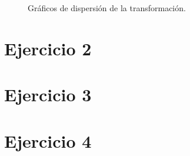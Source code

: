 \documentclass[12pt, a4paper]{article}
\begin{document}
\begin{figure}[htbp]
  \centering
  \hfill
  \caption{Gráficos de dispersión de la transformación.}
  \label{fig:imgs_comp}
\end{figure}

\section{Ejercicio 2}

\section{Ejercicio 3}

\section{Ejercicio 4}
\end{document}
